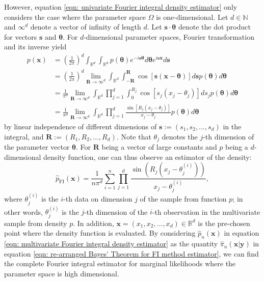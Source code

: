 \documentclass[%
 reprint,
 amsmath,amssymb,
 aps,
]{revtex4-2}
\def\N{\mathbb{N}}
\def\R{\mathbb{R}}
\def\btheta{\boldsymbol{\theta}}
\def\btheta{\boldsymbol{\theta}}
\def\ybold{\mathbf{y}}
\def\xbold{\mathbf{x}}
\def\sbold{\mathbf{s}}
\def\Rbold{\mathbf{R}}
\newcommand{\btheta}{\mbox{\boldmath $\theta$}}
\begin{document}
However, equation \eqref{eqn: univariate Fourier integral density estimator} only considers the case where the parameter space $\Omega$ is one-dimensional. Let  $d \in \N$ and $\infty^d$ denote a vector of infinity of length $d$. Let $\mathbf{s} \cdot \btheta$ denote the dot product for vectors $\mathbf{s}$ and $\btheta$. For $d$-dimensional parameter spaces, Fourier transformation and its inverse yield
\begin{align} \label{eqn: multivariate Fourier integral}
    p(\xbold) & = \left(\frac{1}{2\pi}\right)^d\int_{\R^d} \int_{\R^d}p(\btheta) e^{-i\sbold\btheta}d\btheta e^{i\sbold\xbold}d\sbold \\
    & = \left(\frac{1}{2\pi}\right)^d \lim_{\Rbold \to \infty^d} \int_{\R^d} \int_{-\Rbold}^\Rbold \cos[\sbold(\xbold-\btheta)]d\sbold p(\btheta)d\btheta \\
    & = \frac{1}{\pi^d} \lim_{\Rbold \to \infty^d} \int_{\R^d} \prod_{j=1}^d \int_0^{R_j} \cos[s_j(x_j-\theta_j)]ds_j p(\btheta)d\btheta \\
    & = \frac{1}{\pi^d} \lim_{\Rbold \to \infty^d} \int_{\R^d} \prod_{j=1}^d \frac{\sin[R_j(x_j-\theta_j)]}{x_j-\theta_j} p(\btheta)d\btheta
\end{align}
by linear independence of different dimensions of $\sbold := (s_1, s_2, \ldots, s_d)$ in the integral, and $\Rbold := (R_1, R_2, \ldots, R_d)$. Note that $\theta_j$ denotes the $j$-th dimension of the parameter vector $\btheta$. For $\Rbold$ being a vector of large constants and $p$ being a $d$-dimensional density function, one can thus observe an estimator of the density:
\begin{equation} \label{eqn: multivariate Fourier integral density estimator}
    \hat{p}_\text{FI}(\mathbf{x}) = \frac{1}{n\pi^d}\sum_{i = 1}^n \prod_{j = 1}^d \frac{\sin(R_j(x_j - \theta_j^{(i)}))}{x_j - \theta_j^{(i)}},
\end{equation}
where $\theta_j^{(i)}$ is the $i$-th data on dimension $j$ of the sample from function $p$; in other words, $\theta_j^{(i)}$ is the $j$-th dimension of the $i$-th observation in the multivariate sample from density $p$. In addition, $\mathbf{x} = (x_1, x_2, \ldots, x_d) \in \R^d$ is the pre-chosen point where the density function is evaluated. By considering $\hat{p}_n(\mathbf{x})$ in equation \eqref{eqn: multivariate Fourier integral density estimator} as the quantity $\hat{\pi}_n (\xbold | \ybold)$ in equation \eqref{eqn: re-arranged Bayes' Theorem for FI method estimator}, we can find the complete Fourier integral estimator for marginal likelihoods where the parameter space is high dimensional.
\end{document}
